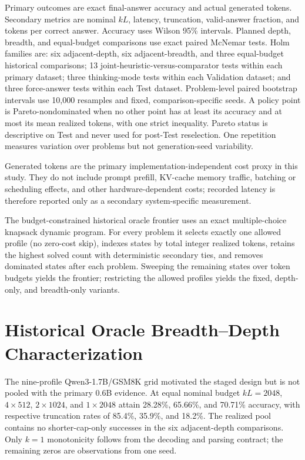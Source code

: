 \documentclass[runningheads]{llncs}
\begin{document}
Primary outcomes are exact final-answer accuracy and actual generated tokens.
Secondary metrics are nominal $kL$, latency, truncation, valid-answer fraction,
and tokens per correct answer. Accuracy uses Wilson 95\% intervals. Planned
depth, breadth, and equal-budget comparisons use exact paired McNemar tests.
Holm families are: six adjacent-depth, six adjacent-breadth, and three
equal-budget historical comparisons; 13 joint-heuristic-versus-comparator
tests within each primary dataset; three thinking-mode tests within each
Validation dataset; and three force-answer tests within each Test dataset.
Problem-level paired bootstrap intervals use 10,000 resamples and fixed,
comparison-specific seeds. A policy point is Pareto-nondominated when no other
point has at least its accuracy and at most its mean realized tokens, with one
strict inequality. Pareto status is descriptive on Test and never used for
post-Test reselection. One repetition measures variation over problems but not
generation-seed variability.

Generated tokens are the primary implementation-independent cost proxy in this
study. They do not include prompt prefill, KV-cache memory traffic, batching or
scheduling effects, and other hardware-dependent costs; recorded latency is
therefore reported only as a secondary system-specific measurement.

The budget-constrained historical oracle frontier uses an exact
multiple-choice knapsack dynamic program. For every problem it selects exactly
one allowed profile (no zero-cost skip), indexes states by total integer
realized tokens, retains the highest solved count with deterministic secondary
ties, and removes dominated states after each problem. Sweeping the remaining
states over token budgets yields the frontier; restricting the allowed
profiles yields the fixed, depth-only, and breadth-only variants.

\section{Historical Oracle Breadth--Depth Characterization}

The nine-profile Qwen3-1.7B/GSM8K grid motivated the staged design but is not
pooled with the primary 0.6B evidence. At equal nominal budget $kL=2048$,
$4\times512$, $2\times1024$, and $1\times2048$ attain 28.28\%, 65.66\%, and
70.71\% accuracy, with respective truncation rates of 85.4\%, 35.9\%, and
18.2\%. The realized pool contains no shorter-cap-only successes in the six
adjacent-depth comparisons. Only $k=1$ monotonicity follows from the decoding
and parsing contract; the remaining zeros are observations from one seed.
\end{document}
